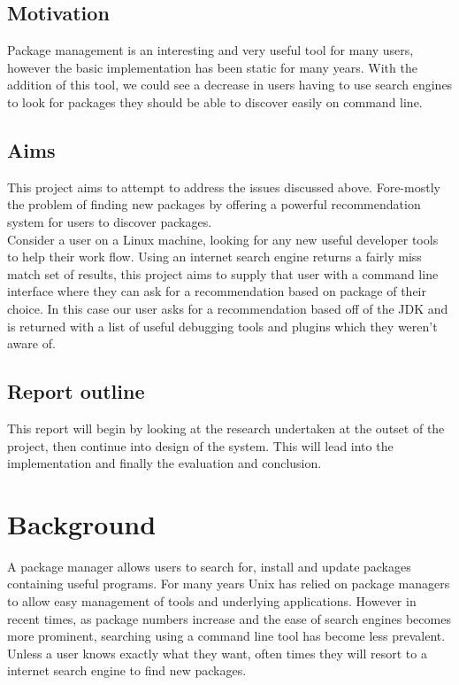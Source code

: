 \documentclass{l4proj}
\begin{document}
\section{Motivation}
Package management is an interesting and very useful tool for many users, however the basic implementation has been static for many years. With the addition of this tool, we could see a decrease in users having to use search engines to look for packages they should be able to discover easily on command line. 
 
\section{Aims}
This project aims to attempt to address the issues discussed above. Fore-mostly the problem of finding new packages by offering a powerful recommendation system for users to discover packages.\\
Consider a user on a Linux machine, looking for any new useful developer tools to help their work flow. Using an internet search engine returns a fairly miss match set of results, this project aims to supply that user with a command line interface where they can ask for a recommendation based on package of their choice. In this case our user asks for a recommendation based off of the JDK and is returned with a list of useful debugging tools and plugins which they weren't aware of.

\section{Report outline}
This report will begin by looking at the research undertaken at the outset of the project, then continue into design of the system. This will lead into the implementation and finally the evaluation and conclusion.
 
 
\chapter{Background}
A package manager allows users to search for, install and update packages containing useful programs. For many years Unix has relied on package managers to allow easy management of tools and underlying applications. However in recent times, as package numbers increase and the ease of search engines becomes more prominent, searching using a command line tool has become less prevalent. Unless a user knows exactly what they want, often times they will resort to a internet search engine to find new packages.\\
\end{document}
